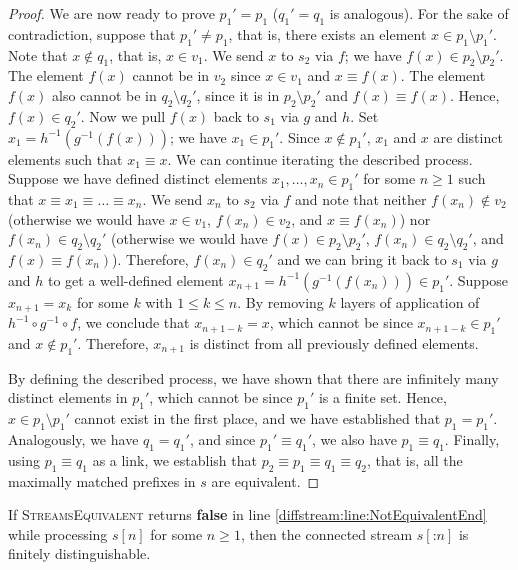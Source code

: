 \begin{proof}
  We are now ready to prove $p_1'=p_1$ ($q_1'=q_1$ is analogous).
  For the sake of contradiction, suppose that $p_1'\neq p_1$, that is,
  there exists an element $x\in p_1\setminus p_1'$. Note that $x\notin
  q_1$, that is, $x\in v_1$.  We send $x$ to $s_2$ via $f$; we have
  $f(x)\in p_2\setminus p_2'$. The element $f(x)$ cannot be in $v_2$
  since $x\in v_1$ and $x\equiv f(x)$. The element $f(x)$ also cannot
  be in $q_2\setminus q_2'$, since it is in $p_2\setminus p_2'$ and
  $f(x)\equiv f(x)$. Hence, $f(x)\in q_2'$.  Now we pull $f(x)$ back
  to $s_1$ via $g$ and $h$. Set $x_1=h^{-1}(g^{-1}(f(x)))$; we have
  $x_1 \in p_1'$. Since $x\notin p_1'$, $x_1$ and $x$ are distinct
  elements such that $x_1\equiv x$. We can continue iterating the
  described process. Suppose we have defined distinct elements $x_1,
  \ldots, x_n\in p_1'$ for some $n\geq 1$ such that $x\equiv x_1\equiv
  \ldots \equiv x_n$. We send $x_n$ to $s_2$ via $f$ and note that
  neither $f(x_n)\notin v_2$ (otherwise we would have $x\in v_1$,
  $f(x_n)\in v_2$, and $x\equiv f(x_n)$) nor $f(x_n)\in q_2\setminus
  q_2'$ (otherwise we would have $f(x)\in p_2\setminus p_2'$,
  $f(x_n)\in q_2\setminus q_2'$, and $f(x)\equiv f(x_n)$). Therefore,
  $f(x_n)\in q_2'$ and we can bring it back to $s_1$ via $g$ and $h$
  to get a well-defined element $x_{n+1}= h^{-1}(g^{-1}(f(x_n)))\in
  p_1'$. Suppose $x_{n+1}=x_{k}$ for some $k$ with $1\leq k \leq
  n$. By removing $k$ layers of application of $h^{-1}\circ
  g^{-1}\circ f$, we conclude that $x_{n+1-k}=x$, which cannot be
  since $x_{n+1-k}\in p_1'$ and $x\notin p_1'$. Therefore, $x_{n+1}$
  is distinct from all previously defined elements.

  By defining the described process, we have shown that
  there are infinitely many distinct elements in $p_1'$, which cannot be
  since $p_1'$ is a finite set. Hence, $x\in
  p_1\setminus p_1'$ cannot exist in the first place, and we have
  established that $p_1=p_1'$. Analogously,
  we have $q_1=q_1'$, and since $p_1'\equiv q_1'$, we also have $p_1\equiv q_1$.
  Finally,
  using $p_1\equiv q_1$ as a link, we establish that $p_2\equiv p_1\equiv
   q_1\equiv q_2$, that is, all the maximally matched prefixes in $s$ are
  equivalent.
\end{proof}

\begin{lemma}\label{diffstream:lem:finitely-distinguishable}
  If \textsc{StreamsEquivalent} returns \textbf{false} in line \ref{diffstream:line:NotEquivalentEnd} while processing $s[n]$ for
  some $n\geq 1$, then the connected stream $s[\mathbin{:} n]$ is finitely distinguishable.
\end{lemma}

